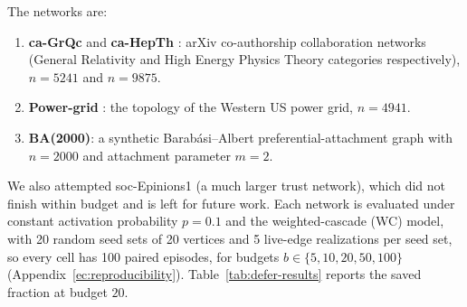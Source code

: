 \documentclass[preprint,11pt]{elsarticle}
\theoremstyle{definition}
\theoremstyle{remark}
\begin{document}
\noindent The networks are:

\begin{enumerate}
\item \textbf{ca-GrQc} and \textbf{ca-HepTh} \citep{leskovec2007}: arXiv
  co-authorship collaboration networks (General Relativity and High Energy
  Physics Theory categories respectively), $n=5241$ and $n=9875$.
\item \textbf{Power-grid} \citep{watts1998}: the topology of the Western
  US power grid, $n=4941$.
\item \textbf{BA(2000)}: a synthetic Barab\'asi--Albert preferential-attachment
  graph \citep{barabasi1999} with $n=2000$ and attachment parameter $m=2$.
\end{enumerate}

\noindent We also attempted soc-Epinions1 (a much larger trust network), which did not finish within budget and is left for future work. Each network is evaluated under constant activation probability $p=0.1$ and the weighted-cascade (WC) model, with 20 random seed sets of 20 vertices and 5 live-edge realizations per seed set, so every cell has 100 paired episodes, for budgets $b\in\{5,10,20,50,100\}$ (Appendix~\ref{ec:reproducibility}). Table~\ref{tab:defer-results} reports the saved fraction at budget $20$.
\end{document}
